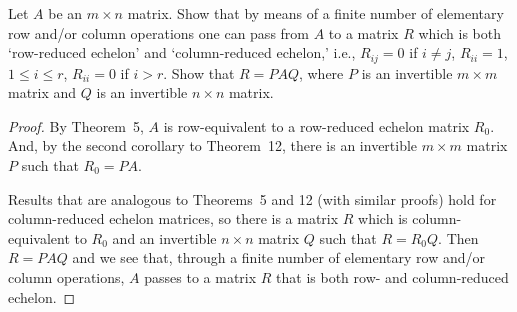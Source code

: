 
 Let $A$ be an $m\times n$ matrix. Show that by means of
a finite number of elementary row and/or column operations one can
pass from $A$ to a matrix $R$ which is both `row-reduced echelon' and
`column-reduced echelon,' i.e., $R_{ij} = 0$ if $i\neq j$,
$R_{ii} = 1$, $1\leq i\leq r$, $R_{ii} = 0$ if $i > r$. Show that
$R = PAQ$, where $P$ is an invertible $m\times m$ matrix and $Q$ is an
invertible $n\times n$ matrix.
\begin{proof}
  By Theorem~5, $A$ is row-equivalent to a row-reduced echelon matrix
  $R_0$. And, by the second corollary to Theorem~12, there is an
  invertible $m\times m$ matrix $P$ such that $R_0 = PA$.

  Results that are analogous to Theorems~5 and 12 (with similar
  proofs) hold for column-reduced echelon matrices, so there is a
  matrix $R$ which is column-equivalent to $R_0$ and an invertible
  $n\times n$ matrix $Q$ such that $R = R_0Q$. Then $R = PAQ$ and we
  see that, through a finite number of elementary row and/or column
  operations, $A$ passes to a matrix $R$ that is both row- and
  column-reduced echelon.
\end{proof}
